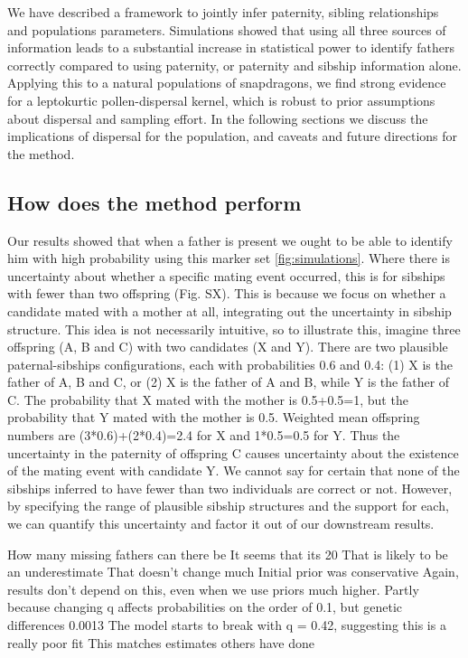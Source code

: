 \documentclass[10pt, a4paper, twocolumn]{article} %
\begin{document}
We have described a framework to jointly infer paternity, sibling relationships and populations parameters. Simulations showed that using all three sources of information leads to a substantial increase in statistical power to identify fathers correctly compared to using paternity, or paternity and sibship information alone. Applying this to a natural populations of snapdragons, we find strong evidence for a leptokurtic pollen-dispersal kernel, which is robust to prior assumptions about dispersal and sampling effort. In the following sections we discuss the implications of dispersal for the population, and caveats and future directions for the method.

\subsection{How does the method perform}

Our results showed that when a father is present we ought to be able to identify him with high probability using this marker set \ref{fig:simulations}.
Where there is uncertainty about whether a specific mating event occurred, this is for sibships with fewer than two offspring (Fig. SX).
This is because we focus on whether a candidate mated with a mother at all, integrating out the uncertainty in sibship structure.
This idea is not necessarily intuitive, so to illustrate this, imagine three offspring (A, B and C) with two candidates (X and Y).
There are two plausible paternal-sibships configurations, each with probabilities 0.6 and 0.4: (1) X is the father of A, B and C, or (2) X is the father of A and B, while Y is the father of C.
The probability that X mated with the mother is 0.5+0.5=1, but the probability that Y mated with the mother is 0.5.
Weighted mean offspring numbers are (3*0.6)+(2*0.4)=2.4 for X and 1*0.5=0.5 for Y.
Thus the uncertainty in the paternity of offspring C causes uncertainty about the existence of the mating event with candidate Y.
We cannot say for certain that none of the sibships inferred to have fewer than two individuals are correct or not.
However, by specifying the range of plausible sibship structures and the support for each, we can quantify this uncertainty and factor it out of our downstream results.

How many missing fathers can there be
It seems that its 20%
That is likely to be an underestimate
That doesn't change much
Initial prior was conservative
Again, results don't depend on this, even when we use priors much higher.
Partly because changing q affects probabilities on the order of 0.1, but genetic differences 0.0013
The model starts to break with q = 0.42, suggesting this is a really poor fit
This matches estimates others have done
\end{document}
